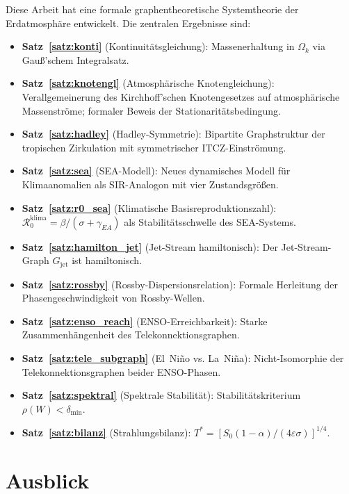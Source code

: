 ﻿\documentclass[a4paper,12pt]{article}
\theoremstyle{definition}
\begin{document}
Diese Arbeit hat eine formale graphentheoretische Systemtheorie der Erdatmosph\"are
entwickelt. Die zentralen Ergebnisse sind:

\begin{itemize}
    \item \textbf{Satz~\ref{satz:konti}} (Kontinuit\"atsgleichung): Massenerhaltung
          in $\Omega_k$ via Gau{\ss}'schem Integralsatz.
    \item \textbf{Satz~\ref{satz:knotengl}} (Atmosph\"arische Knotengleichung):
          Verallgemeinerung des Kirchhoff'schen Knotengesetzes auf atmosph\"arische
          Massenstr\"ome; formaler Beweis der Stationarit\"atsbedingung.
    \item \textbf{Satz~\ref{satz:hadley}} (Hadley-Symmetrie): Bipartite Graphstruktur
          der tropischen Zirkulation mit symmetrischer ITCZ-Einstr\"omung.
    \item \textbf{Satz~\ref{satz:sea}} (SEA-Modell): Neues dynamisches Modell f\"ur
          Klimaanomalien als SIR-Analogon mit vier Zustandsgr\"o{\ss}en.
    \item \textbf{Satz~\ref{satz:r0_sea}} (Klimatische Basisreproduktionszahl):
          $\mathcal{R}_0^{\mathrm{klima}} = \beta/(\sigma+\gamma_{EA})$ als
          Stabili\-t\"atsschwelle des SEA-Systems.
    \item \textbf{Satz~\ref{satz:hamilton_jet}} (Jet-Stream hamiltonisch): Der
          Jet-Stream-Graph $G_{\mathrm{jet}}$ ist hamiltonisch.
    \item \textbf{Satz~\ref{satz:rossby}} (Rossby-Dispersionsrelation): Formale
          Herleitung der Phasengeschwindigkeit von Rossby-Wellen.
    \item \textbf{Satz~\ref{satz:enso_reach}} (ENSO-Erreichbarkeit): Starke
          Zusammenh\"angenheit des Telekonnektionsgraphen.
    \item \textbf{Satz~\ref{satz:tele_subgraph}} (El~Ni\~no vs. La~Ni\~na):
          Nicht-Isomorphie der Telekonnektionsgraphen beider ENSO-Phasen.
    \item \textbf{Satz~\ref{satz:spektral}} (Spektrale Stabilit\"at): Stabilit\"atskriterium
          $\rho(W) < \delta_{\min}$.
    \item \textbf{Satz~\ref{satz:bilanz}} (Strahlungsbilanz): $T^* = [S_0(1-\alpha)/(4\varepsilon\sigma)]^{1/4}$.
\end{itemize}

\section{Ausblick}
\end{document}
